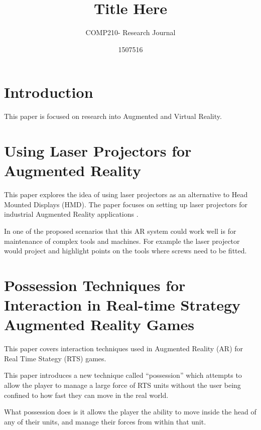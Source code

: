 \documentclass{scrartcl}
\title{Title Here}
\subtitle{COMP210- Research Journal}
\author{1507516}
\begin{document}
\maketitle

\abstract{}


\section{Introduction}
This paper is focused on research into Augmented and Virtual Reality.

\cite{nielsen1990heuristic}

\section {Using Laser Projectors for Augmented Reality\cite{Schwerdtfeger:2008}}

This paper explores the idea of using laser projectors as an alternative to Head Mounted Displays (HMD).
The paper focuses on setting up laser projectors for industrial Augmented Reality applications \cite{Schwerdtfeger:2008}.

In one of the proposed scenarios that this AR system could work well is for maintenance of complex tools and machines. For example the laser projector would project and highlight points on the tools where screws need to be fitted.

\section {Possession Techniques for Interaction in Real-time Strategy Augmented Reality Games \cite{Phillips:2005}}
This paper covers interaction techniques used in Augmented Reality (AR) for Real Time Stategy (RTS) games.

This paper introduces a new technique called ``possession'' which attempts to allow the player to manage a large force of RTS units without the user being confined to how fast they can move in the real world.

What possession does is it allows the player the ability to move inside the head of any of their units,  and manage their forces from within that unit. 
\end{document}

